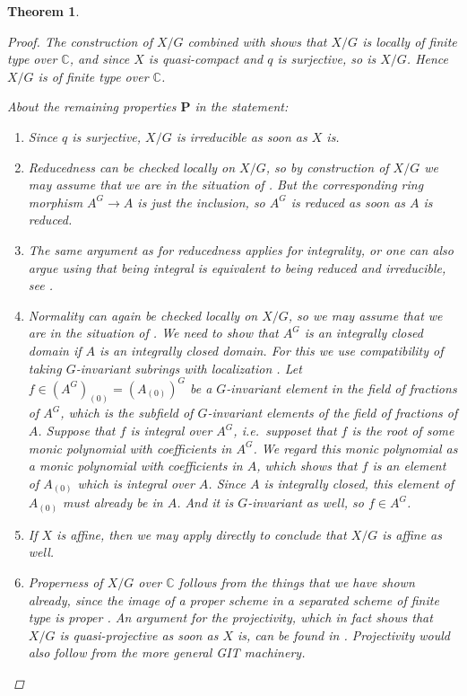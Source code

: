 \documentclass[12pt,a4paper]{amsart}
\theoremstyle{plain}
\newtheorem{thm}{Theorem}[section]
\theoremstyle{definition}
\theoremstyle{remark}
\begin{document}
\begin{thm}
\begin{proof}
    The construction of $X/G$ combined with  shows that $X/G$ is locally of finite type over $\mathbb{C}$, and since $X$ is quasi-compact and $q$ is surjective, so is $X/G$.
    Hence $X/G$ is of finite type over $\mathbb{C}$.
    
    About the remaining properties $\mathbf{P}$ in the statement:
    \begin{enumerate}[label=(\alph*)]
      \item Since $q$ is surjective, $X/G$ is irreducible as soon as $X$ is.
      \item Reducedness can be checked locally on $X/G$, so by construction of $X/G$ we may assume that we are in the situation of .
        But the corresponding ring morphism $A^{G} \to A$ is just the inclusion, so $A^{G}$ is reduced as soon as $A$ is reduced.
      \item The same argument as for reducedness applies for integrality, or one can also argue using that being integral is equivalent to being reduced and irreducible, see \cite[Proposition II.3.1]{har77}.
      \item Normality can again be checked locally on $X/G$, so we may assume that we are in the situation of .
        We need to show that $A^{G}$ is an integrally closed domain if $A$ is an integrally closed domain.
        For this we use compatibility of taking $G$-invariant subrings with localization \cite[Exercise 5.12]{am69}.
        Let $f \in (A^{G})_{(0)} = (A_{(0)})^{G}$ be a $G$-invariant element in the field of fractions of $A^{G}$, which is the subfield of $G$-invariant elements of the field of fractions of $A$.
        Suppose that $f$ is integral over $A^{G}$, i.e.~supposet that $f$ is the root of some monic polynomial with coefficients in $A^{G}$.
        We regard this monic polynomial as a monic polynomial with coefficients in $A$, which shows that $f$ is an element of $A_{(0)}$ which is integral over $A$.
        Since $A$ is integrally closed, this element of $A_{(0)}$ must already be in $A$.
        And it is $G$-invariant as well, so $f \in A^{G}$.
      \item If $X$ is affine, then we may apply  directly to conclude that $X/G$ is affine as well.
      \item Properness of $X/G$ over $\mathbb{C}$ follows from the things that we have shown already, since the image of a proper scheme in a separated scheme of finite type is proper \cite[\href{https://stacks.math.columbia.edu/tag/03GN}{Tag 03GN}]{stacks-project}.
        An argument for the projectivity, which in fact shows that $X/G$ is quasi-projective as soon as $X$ is, can be found in \cite[Proposition IV.1.5]{knu71}.
        Projectivity would also follow from the more general GIT machinery.
    \end{enumerate}
  \end{proof}
\end{thm}



\vfill
\end{document}

